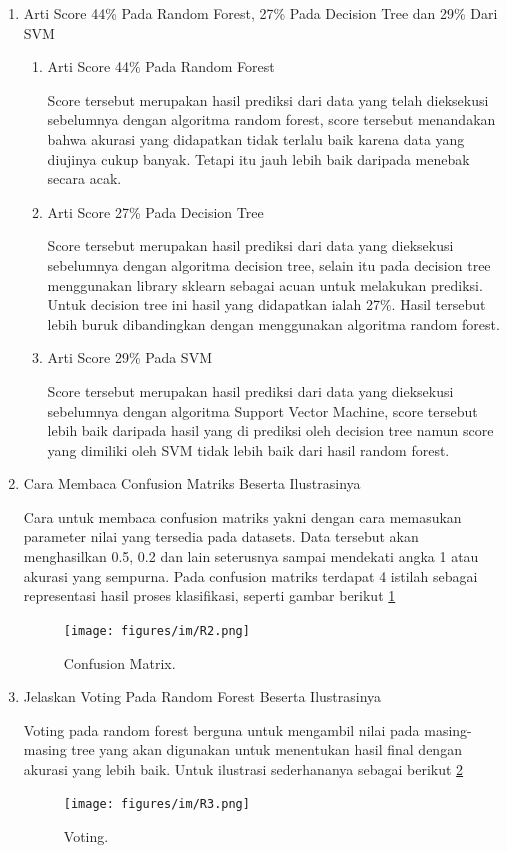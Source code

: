 \begin{enumerate}
\item Arti Score 44\% Pada Random Forest, 27\% Pada Decision Tree dan 29\% Dari SVM \par
\begin{enumerate}
\item Arti Score 44\% Pada Random Forest \par
Score tersebut merupakan hasil prediksi dari data yang telah dieksekusi sebelumnya dengan algoritma random forest, score tersebut menandakan bahwa akurasi yang didapatkan tidak terlalu baik karena data yang diujinya cukup banyak. Tetapi itu jauh lebih baik daripada menebak secara acak.
\item Arti Score 27\% Pada Decision Tree \par
Score tersebut merupakan hasil prediksi dari data yang dieksekusi sebelumnya dengan algoritma decision tree, selain itu pada decision tree menggunakan library sklearn sebagai acuan untuk melakukan prediksi. Untuk decision tree ini hasil yang didapatkan ialah 27\%. Hasil tersebut lebih buruk dibandingkan dengan menggunakan algoritma random forest.
\item Arti Score 29\% Pada SVM \par
Score tersebut merupakan hasil prediksi dari data yang dieksekusi sebelumnya dengan algoritma Support Vector Machine, score tersebut lebih baik daripada hasil yang di prediksi oleh decision tree namun score yang dimiliki oleh SVM tidak lebih baik dari hasil random forest.
\end{enumerate}

\item Cara Membaca Confusion Matriks Beserta Ilustrasinya \par
Cara untuk membaca confusion matriks yakni dengan cara memasukan parameter nilai yang tersedia pada datasets. Data tersebut akan  menghasilkan 0.5, 0.2 dan lain seterusnya sampai mendekati angka 1 atau akurasi yang sempurna. Pada confusion matriks terdapat 4 istilah sebagai representasi hasil proses klasifikasi, seperti gambar berikut \ref{R2}
		\begin{figure}[ht]
		\centerline{\texttt{[image: figures/im/R2.png]}}
		\caption{Confusion Matrix.}
		\label{R2}
		\end{figure}

\item Jelaskan Voting Pada Random Forest Beserta Ilustrasinya \par
Voting pada random forest berguna untuk mengambil nilai pada masing-masing tree yang akan digunakan untuk menentukan hasil final dengan akurasi yang lebih baik. Untuk ilustrasi sederhananya sebagai berikut \ref{R3}
		\begin{figure}[ht]
		\centerline{\texttt{[image: figures/im/R3.png]}}
		\caption{Voting.}
		\label{R3}
		\end{figure}
\end{enumerate}



